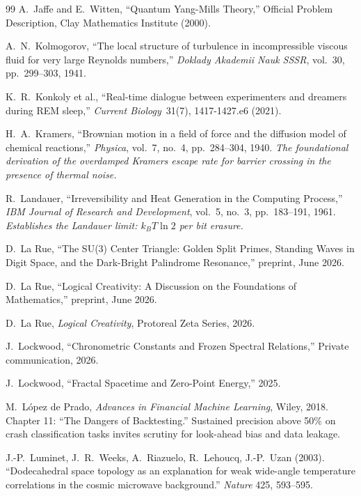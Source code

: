 \documentclass[12pt,oneside]{book}
\begin{document}
\begin{thebibliography}{99}
A.~Jaffe and E.~Witten,
``Quantum Yang-Mills Theory,''
Official Problem Description, Clay Mathematics Institute (2000).

A.~N.~Kolmogorov,
``The local structure of turbulence in incompressible viscous fluid for very large Reynolds numbers,''
\emph{Doklady Akademii Nauk SSSR}, vol.~30, pp.~299--303, 1941.

K.~R.~Konkoly et al., ``Real-time dialogue between experimenters and dreamers during REM sleep,'' \emph{Current Biology}\ 31(7), 1417-1427.e6 (2021).

H.~A.~Kramers,
``Brownian motion in a field of force and the diffusion model of chemical reactions,''
\emph{Physica}, vol.~7, no.~4, pp.~284--304, 1940.
\textit{The foundational derivation of the overdamped Kramers escape rate for barrier crossing in the presence of thermal noise.}

R.~Landauer,
``Irreversibility and Heat Generation in the Computing Process,''
\emph{IBM Journal of Research and Development}, vol.~5, no.~3, pp.~183--191, 1961.
\textit{Establishes the Landauer limit: $k_B T \ln 2$ per bit erasure.}

D.~La Rue, ``The SU(3) Center Triangle: Golden Split Primes, Standing Waves in Digit Space, and the Dark-Bright Palindrome Resonance,'' preprint, June 2026.

D.~La Rue, ``Logical Creativity: A Discussion on the Foundations of Mathematics,'' preprint, June 2026.

D.~La Rue, \emph{Logical Creativity}, Protoreal Zeta Series, 2026.

J.~Lockwood,
``Chronometric Constants and Frozen Spectral Relations,''
Private communication, 2026.

J.~Lockwood,
``Fractal Spacetime and Zero-Point Energy,'' 2025.

M.~L\'{o}pez de Prado,
\emph{Advances in Financial Machine Learning},
Wiley, 2018.
Chapter 11: ``The Dangers of Backtesting.'' Sustained precision above 50\% on crash classification tasks invites scrutiny for look-ahead bias and data leakage.

J.-P.~Luminet, J.~R.~Weeks, A.~Riazuelo, R.~Lehoucq, J.-P.~Uzan (2003).
``Dodecahedral space topology as an explanation for weak wide-angle temperature correlations in the cosmic microwave background.''
\textit{Nature} 425, 593--595.


\end{thebibliography}
\end{document}
